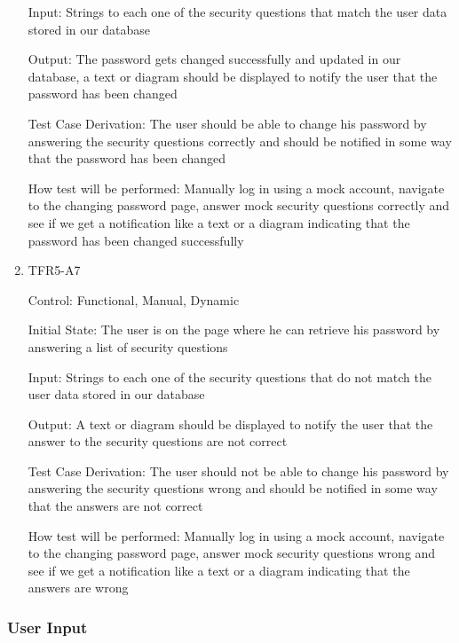 \documentclass[12pt, titlepage]{article}
\begin{document}
\begin{enumerate}
  Input:  Strings to each one of the security questions that match the user data stored in our database
            
  Output: The password gets changed successfully and updated in our database, a text or diagram should be displayed to notify the user that the password has been changed 
  
  Test Case Derivation: The user should be able to change his password by answering the security questions correctly and should be notified in some way that the password has been changed
            
  How test will be performed: Manually log in using a mock account, navigate to the changing password page, answer mock security questions correctly and see if we get a notification like a text or a diagram indicating that the password has been changed successfully
  
  \item{TFR5-A7\\}
  
  Control: Functional, Manual, Dynamic
            
  Initial State: The user is on the page where he can retrieve his password by answering a list of security questions
            
  Input:  Strings to each one of the security questions that do not match the user data stored in our database
            
  Output: A text or diagram should be displayed to notify the user that the answer to the security questions are not correct
  
  Test Case Derivation: The user should not be able to change his password by answering the security questions wrong and should be notified in some way that the answers are not correct
            
  How test will be performed: Manually log in using a mock account, navigate to the changing password page, answer mock security questions wrong and see if we get a notification like a text or a diagram indicating that the answers are wrong
  
  \end{enumerate}
  
  \subsubsection{User Input}
  
\end{document}
